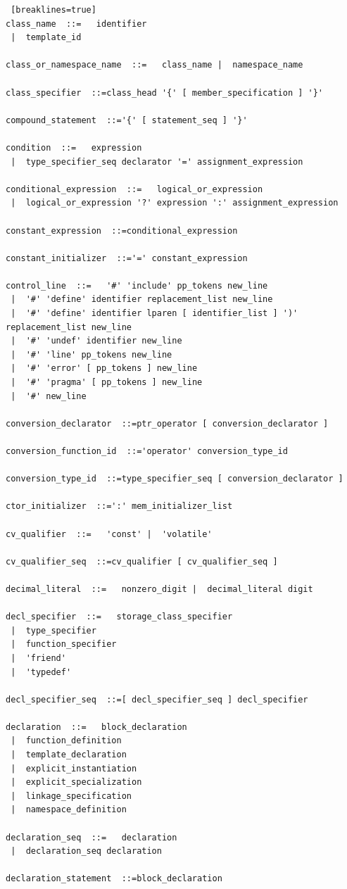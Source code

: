 \documentclass[11pt]{book}
\begin{document}
\begin{lstlisting} [breaklines=true]
class_name  ::=   identifier
 |  template_id

class_or_namespace_name  ::=   class_name |  namespace_name

class_specifier  ::=class_head '{' [ member_specification ] '}'

compound_statement  ::='{' [ statement_seq ] '}'

condition  ::=   expression
 |  type_specifier_seq declarator '=' assignment_expression

conditional_expression  ::=   logical_or_expression
 |  logical_or_expression '?' expression ':' assignment_expression

constant_expression  ::=conditional_expression

constant_initializer  ::='=' constant_expression

control_line  ::=   '#' 'include' pp_tokens new_line
 |  '#' 'define' identifier replacement_list new_line
 |  '#' 'define' identifier lparen [ identifier_list ] ')' replacement_list new_line
 |  '#' 'undef' identifier new_line
 |  '#' 'line' pp_tokens new_line
 |  '#' 'error' [ pp_tokens ] new_line
 |  '#' 'pragma' [ pp_tokens ] new_line
 |  '#' new_line

conversion_declarator  ::=ptr_operator [ conversion_declarator ]

conversion_function_id  ::='operator' conversion_type_id

conversion_type_id  ::=type_specifier_seq [ conversion_declarator ]

ctor_initializer  ::=':' mem_initializer_list

cv_qualifier  ::=   'const' |  'volatile'

cv_qualifier_seq  ::=cv_qualifier [ cv_qualifier_seq ]

decimal_literal  ::=   nonzero_digit |  decimal_literal digit

decl_specifier  ::=   storage_class_specifier
 |  type_specifier
 |  function_specifier
 |  'friend'
 |  'typedef'

decl_specifier_seq  ::=[ decl_specifier_seq ] decl_specifier

declaration  ::=   block_declaration
 |  function_definition
 |  template_declaration
 |  explicit_instantiation
 |  explicit_specialization
 |  linkage_specification
 |  namespace_definition

declaration_seq  ::=   declaration
 |  declaration_seq declaration

declaration_statement  ::=block_declaration


\end{lstlisting}
\end{document}
